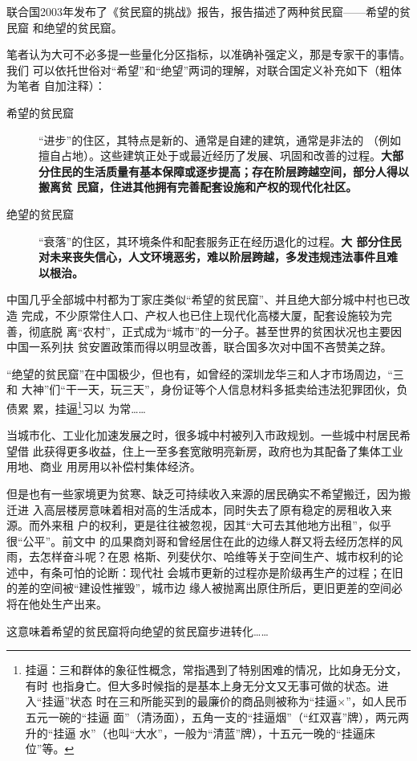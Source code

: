 联合国2003年发布了《贫民窟的挑战》报告，报告描述了两种贫民窟——希望的贫民窟
和绝望的贫民窟。

笔者认为大可不必多提一些量化分区指标，以准确补强定义，那是专家干的事情。我们
可以依托世俗对“希望”和“绝望”两词的理解，对联合国定义补充如下（粗体为笔者
自加注释）：
\begin{description}
\item[希望的贫民窟] “进步”的住区，其特点是新的、通常是自建的建筑，通常是非法的
  （例如擅自占地）。这些建筑正处于或最近经历了发展、巩固和改善的过程。\textbf{大部
    分住民的生活质量有基本保障或逐步提高；存在阶层跨越空间，部分人得以搬离贫
    民窟，住进其他拥有完善配套设施和产权的现代化社区。}
\item[绝望的贫民窟] “衰落”的住区，其环境条件和配套服务正在经历退化的过程。\textbf{大
    部分住民对未来丧失信心，人文环境恶劣，难以阶层跨越，多发违规违法事件且难
    以根治。}
\end{description}

中国几乎全部城中村都为丁家庄类似“希望的贫民窟”、并且绝大部分城中村也已改造
完成，不少原常住人口、产权人也已住上现代化高楼大厦，配套设施较为完善，彻底脱
离“农村”，正式成为“城市”的一分子。甚至世界的贫困状况也主要因中国一系列扶
贫安置政策而得以明显改善，联合国多次对中国不吝赞美之辞。

“绝望的贫民窟”在中国极少，但也有，如曾经的深圳龙华三和人才市场周边，“三和
大神”们“干一天，玩三天”，身份证等个人信息材料多抵卖给违法犯罪团伙，负债累
累，挂逼\footnote{挂逼：三和群体的象征性概念，常指遇到了特别困难的情况，比如身无分文，有时
  也指身亡。但大多时候指的是基本上身无分文又无事可做的状态。进入“挂逼”状态
  时在三和所能买到的最廉价的商品则被称为“挂逼×”，如人民币五元一碗的“挂逼
  面”（清汤面），五角一支的“挂逼烟”（“红双喜”牌），两元两升的“挂逼
  水”（也叫“大水”，一般为“清蓝”牌），十五元一晚的“挂逼床位”等。}习以
为常……


当城市化、工业化加速发展之时，很多城中村被列入市政规划。一些城中村居民希望借
此获得更多收益，住上一至多套宽敞明亮新房，政府也为其配备了集体工业用地、商业
用房用以补偿村集体经济。


但是也有一些家境更为贫寒、缺乏可持续收入来源的居民确实不希望搬迁，因为搬迁进
入高层楼房意味着相对高的生活成本，同时失去了原有稳定的房租收入来源。而外来租
户的权利，更是往往被忽视，因其“大可去其他地方出租”，似乎很“公平”。前文中
的瓜果商刘哥和曾经居住在此的边缘人群又将去经历怎样的风雨，去怎样奋斗呢？在恩
格斯、列斐伏尔、哈维等关于空间生产、城市权利的论述中，有条可怕的论断：现代社
会城市更新的过程亦是阶级再生产的过程；在旧的差的空间被“建设性摧毁”，城市边
缘人被抛离出原住所后，更旧更差的空间必将在他处生产出来。

这意味着希望的贫民窟将向绝望的贫民窟步进转化……


